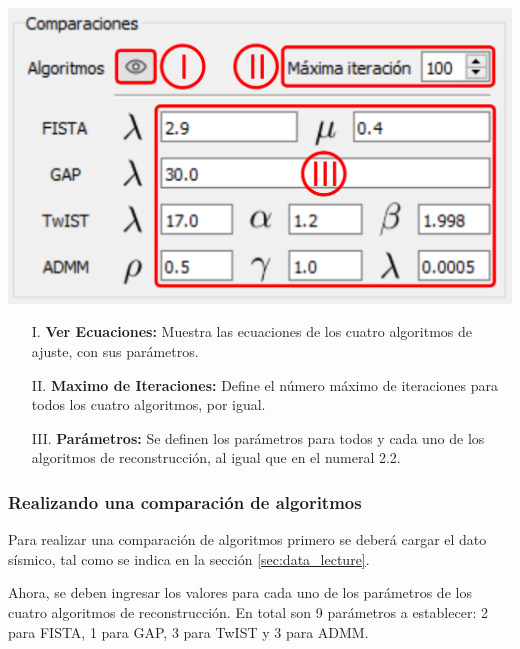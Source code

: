 \documentclass[12pt,twoside,letter]{ol-softwaremanual}
\newenvironment{Figure}
  {\par\medskip\noindent\minipage{\linewidth}}
  {\endminipage\par\medskip}
\begin{document}
\begin{multicols}{2}
	
	\begin{Figure}
		\centering
		\includegraphics[width=0.9\linewidth]{comp-panel.png}
		\label{fig:comp_panel}
	\end{Figure}	
	
	\begin{itemize}
		
		\item[I.] \textbf{Ver Ecuaciones:} Muestra las ecuaciones de los cuatro algoritmos de ajuste, con sus parámetros.
		\item[II.] \textbf{Maximo de Iteraciones:} Define el número máximo de iteraciones para todos los cuatro algoritmos, por igual.
		\item[III.] \textbf{Parámetros:} Se definen los parámetros para todos y cada uno de los algoritmos de reconstrucción, al igual que en el numeral 2.2.
		
	\end{itemize}
	
\end{multicols}

\subsubsection*{Realizando una comparación de algoritmos}

Para realizar una comparación de algoritmos primero se deberá cargar el dato sísmico, tal como se indica en la sección \ref{sec:data_lecture}.

Ahora, se deben ingresar los valores para cada uno de los parámetros de los cuatro algoritmos de reconstrucción. En total son 9 parámetros a establecer: 2 para FISTA, 1 para GAP, 3 para TwIST y 3 para ADMM.
\end{document}

